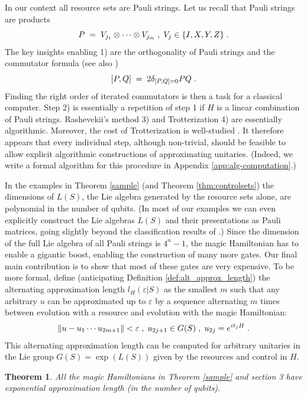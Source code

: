 \documentclass[12pt, a4-paper]{amsart}
\numberwithin{equation}{section}
\newcommand{\lel}{\pl = \pl}
\newcommand{\ten}{\otimes}
\newcommand{\pl}{\hspace{.1cm}}
\newcommand{\eps}{\varepsilon}
\newtheorem{theorem}[lemma]{Theorem}
\begin{document}
In our context all resource sets are Pauli strings. Let us recall that Pauli strings are products
 \[ P\lel V_{j_1}\ten \cdots \ten V_{j_m} \pl ,\pl V_j\in \{I,X,Y,Z\} \pl .\] 
The key insights enabling 1) are the orthogonality of Pauli strings and the commutator formula (see also \cite{Aguilar2024FullClassificationLie})  
\begin{equation}\label{pq}
  [P,Q] \lel 2 \delta_{[P,Q]=0} PQ \pl .
 \end{equation} Finding the right order of iterated commutators is then a task for a classical computer. Step 2) is essentially a repetition of step 1 if $H$ is a linear combination of Pauli strings.   
Rashevekii's method 3) and Trotterization 4) are essentially algorithmic. Moreover, the cost of Trotterization is well-studied \cite{Childs:2019hts}. It therefore appears that every individual step, although non-trivial, should be feasible to allow explicit algorithmic constructions of approximating unitaries. (Indeed, we write a formal algorithm for this procedure in Appendix \ref{app:alg-computation}.)  

In the examples in Theorem \ref{sample} (and Theorem \ref{thm:controlsets}) the dimensions of $L(S)$, the Lie algebra generated by the resource sets alone, are polynomial in the number of qubits. (In most of our examples we can even explicitly construct the Lie algebras $L(S)$ and their presentations as Pauli matrices, going slightly beyond the classification results of \cite{Aguilar2024FullClassificationLie}.) Since the dimension of the full Lie algebra of all Pauli strings is $4^{n}-1$, the magic Hamiltonian has to enable a gigantic boost, enabling the construction of many more gates. Our final main contribution is to show that most of these gates are very expensive. To be more formal, define (anticipating Definition \ref{def:alt_approx_length}) the alternating approximation length $l_H(\eps|S)$ as the smallest $m$ such that  any arbitrary $u$ can be approximated up to $\eps$ by a sequence alternating $m$ times between evolution with a resource and evolution with the magic Hamiltonian: 
 \[ \|u-u_1\cdots u_{2m+1}\|<\eps \pl ,\pl u_{2j+1}\in G(S) \pl ,\pl u_{2j}=e^{it_jH} \pl.\]
This alternating approximation length can be computed for arbitrary unitaries in the Lie group $G(S)=\exp(L(S))$ given by the resources and control in $H$.       

\begin{theorem} All the magic Hamiltonians in Theorem \ref{sample} and section 3 have exponential approximation length (in the number of qubits).
\end{theorem}
\end{document}

